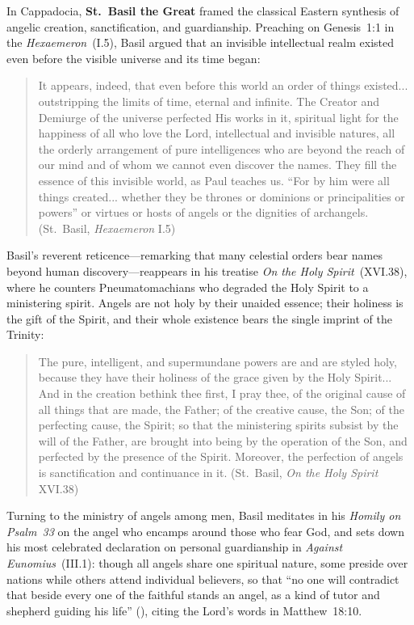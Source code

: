 In Cappadocia, \textbf{St.~Basil the Great} framed the classical Eastern synthesis of angelic creation, sanctification, and guardianship. Preaching on Genesis~1:1 in the \emph{Hexaemeron}~(I.5), Basil argued that an invisible intellectual realm existed even before the visible universe and its time began:
\begin{quotation}
It appears, indeed, that even before this world an order of things existed... outstripping the limits of time, eternal and infinite. The Creator and Demiurge of the universe perfected His works in it, spiritual light for the happiness of all who love the Lord, intellectual and invisible natures, all the orderly arrangement of pure intelligences who are beyond the reach of our mind and of whom we cannot even discover the names. They fill the essence of this invisible world, as Paul teaches us. ``For by him were all things created... whether they be thrones or dominions or principalities or powers'' or virtues or hosts of angels or the dignities of archangels. (St.~Basil, \emph{Hexaemeron} I.5)
\end{quotation}
Basil's reverent reticence---remarking that many celestial orders bear names beyond human discovery---reappears in his treatise \emph{On the Holy Spirit}~(XVI.38), where he counters Pneumatomachians who degraded the Holy Spirit to a ministering spirit. Angels are not holy by their unaided essence; their holiness is the gift of the Spirit, and their whole existence bears the single imprint of the Trinity:
\begin{quotation}
The pure, intelligent, and supermundane powers are and are styled holy, because they have their holiness of the grace given by the Holy Spirit... And in the creation bethink thee first, I pray thee, of the original cause of all things that are made, the Father; of the creative cause, the Son; of the perfecting cause, the Spirit; so that the ministering spirits subsist by the will of the Father, are brought into being by the operation of the Son, and perfected by the presence of the Spirit. Moreover, the perfection of angels is sanctification and continuance in it. (St.~Basil, \emph{On the Holy Spirit} XVI.38)
\end{quotation}
Turning to the ministry of angels among men, Basil meditates in his \emph{Homily on Psalm~33} on the angel who encamps around those who fear God, and sets down his most celebrated declaration on personal guardianship in \emph{Against Eunomius}~(III.1): though all angels share one spiritual nature, some preside over nations while others attend individual believers, so that ``no one will contradict that beside every one of the faithful stands an angel, as a kind of tutor and shepherd guiding his life'' (), citing the Lord's words in Matthew~18:10.

